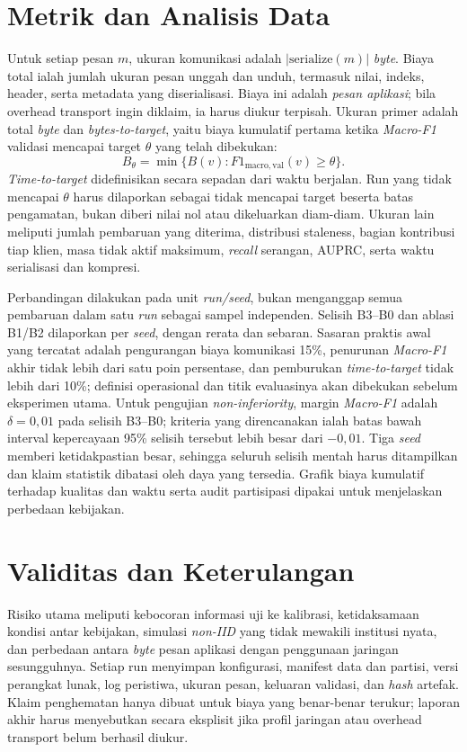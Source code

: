 \section{Metrik dan Analisis Data}
Untuk setiap pesan $m$, ukuran komunikasi adalah $|\mathrm{serialize}(m)|$ \textit{byte}. Biaya total ialah jumlah ukuran pesan unggah dan unduh, termasuk nilai, indeks, header, serta metadata yang diserialisasi. Biaya ini adalah \emph{pesan aplikasi}; bila overhead transport ingin diklaim, ia harus diukur terpisah. Ukuran primer adalah total \textit{byte} dan \textit{bytes-to-target}, yaitu biaya kumulatif pertama ketika \textit{Macro-F1} validasi mencapai target $\theta$ yang telah dibekukan:
\begin{equation}
  B_{\theta}=\min\{B(v): F1_{\mathrm{macro,val}}(v)\geq\theta\}.
\end{equation}
\textit{Time-to-target} didefinisikan secara sepadan dari waktu berjalan. Run yang tidak mencapai $\theta$ harus dilaporkan sebagai tidak mencapai target beserta batas pengamatan, bukan diberi nilai nol atau dikeluarkan diam-diam. Ukuran lain meliputi jumlah pembaruan yang diterima, distribusi staleness, bagian kontribusi tiap klien, masa tidak aktif maksimum, \textit{recall} serangan, AUPRC, serta waktu serialisasi dan kompresi.

Perbandingan dilakukan pada unit \textit{run/seed}, bukan menganggap semua pembaruan dalam satu \textit{run} sebagai sampel independen. Selisih B3--B0 dan ablasi B1/B2 dilaporkan per \textit{seed}, dengan rerata dan sebaran. Sasaran praktis awal yang tercatat adalah pengurangan biaya komunikasi 15\%, penurunan \textit{Macro-F1} akhir tidak lebih dari satu poin persentase, dan pemburukan \textit{time-to-target} tidak lebih dari 10\%; definisi operasional dan titik evaluasinya akan dibekukan sebelum eksperimen utama. Untuk pengujian \textit{non-inferiority}, margin \textit{Macro-F1} adalah $\delta=0{,}01$ pada selisih B3--B0; kriteria yang direncanakan ialah batas bawah interval kepercayaan 95\% selisih tersebut lebih besar dari $-0{,}01$. Tiga \textit{seed} memberi ketidakpastian besar, sehingga seluruh selisih mentah harus ditampilkan dan klaim statistik dibatasi oleh daya yang tersedia. Grafik biaya kumulatif terhadap kualitas dan waktu serta audit partisipasi dipakai untuk menjelaskan perbedaan kebijakan.

\section{Validitas dan Keterulangan}
Risiko utama meliputi kebocoran informasi uji ke kalibrasi, ketidaksamaan kondisi antar kebijakan, simulasi \textit{non-IID} yang tidak mewakili institusi nyata, dan perbedaan antara \textit{byte} pesan aplikasi dengan penggunaan jaringan sesungguhnya. Setiap run menyimpan konfigurasi, manifest data dan partisi, versi perangkat lunak, log peristiwa, ukuran pesan, keluaran validasi, dan \textit{hash} artefak. Klaim penghematan hanya dibuat untuk biaya yang benar-benar terukur; laporan akhir harus menyebutkan secara eksplisit jika profil jaringan atau overhead transport belum berhasil diukur.
